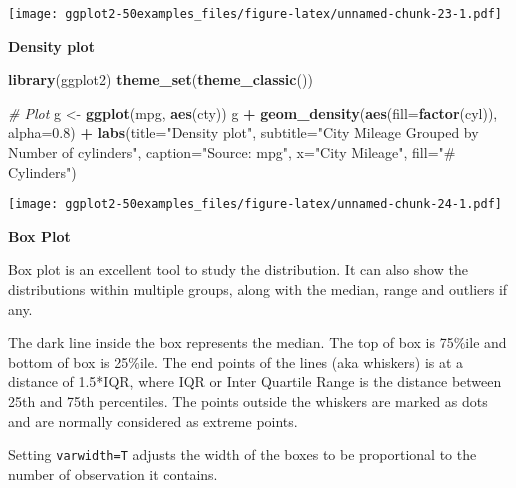 \documentclass[a4paper]{article}
\newenvironment{Shaded}{\begin{snugshade}}{\end{snugshade}}
\newcommand{\KeywordTok}[1]{\textcolor[rgb]{0.13,0.29,0.53}{\textbf{#1}}}
\newcommand{\DataTypeTok}[1]{\textcolor[rgb]{0.13,0.29,0.53}{#1}}
\newcommand{\FloatTok}[1]{\textcolor[rgb]{0.00,0.00,0.81}{#1}}
\newcommand{\StringTok}[1]{\textcolor[rgb]{0.31,0.60,0.02}{#1}}
\newcommand{\CommentTok}[1]{\textcolor[rgb]{0.56,0.35,0.01}{\textit{#1}}}
\newcommand{\OperatorTok}[1]{\textcolor[rgb]{0.81,0.36,0.00}{\textbf{#1}}}
\newcommand{\NormalTok}[1]{#1}
\begin{document}
\texttt{[image: ggplot2-50examples\_files/figure-latex/unnamed-chunk-23-1.pdf]}

\newpage

\textbf{Density plot}

\begin{Shaded}
\begin{Highlighting}[]
\KeywordTok{library}\NormalTok{(ggplot2)}
\KeywordTok{theme_set}\NormalTok{(}\KeywordTok{theme_classic}\NormalTok{())}

\CommentTok{# Plot}
\NormalTok{g <-}\StringTok{ }\KeywordTok{ggplot}\NormalTok{(mpg, }\KeywordTok{aes}\NormalTok{(cty))}
\NormalTok{g }\OperatorTok{+}\StringTok{ }\KeywordTok{geom_density}\NormalTok{(}\KeywordTok{aes}\NormalTok{(}\DataTypeTok{fill=}\KeywordTok{factor}\NormalTok{(cyl)), }\DataTypeTok{alpha=}\FloatTok{0.8}\NormalTok{) }\OperatorTok{+}\StringTok{ }
\StringTok{    }\KeywordTok{labs}\NormalTok{(}\DataTypeTok{title=}\StringTok{"Density plot"}\NormalTok{, }
         \DataTypeTok{subtitle=}\StringTok{"City Mileage Grouped by Number of cylinders"}\NormalTok{,}
         \DataTypeTok{caption=}\StringTok{"Source: mpg"}\NormalTok{,}
         \DataTypeTok{x=}\StringTok{"City Mileage"}\NormalTok{,}
         \DataTypeTok{fill=}\StringTok{"# Cylinders"}\NormalTok{)}
\end{Highlighting}
\end{Shaded}

\texttt{[image: ggplot2-50examples\_files/figure-latex/unnamed-chunk-24-1.pdf]}
\newpage

\textbf{Box Plot}

Box plot is an excellent tool to study the distribution. It can also
show the distributions within multiple groups, along with the median,
range and outliers if any.

The dark line inside the box represents the median. The top of box is
75\%ile and bottom of box is 25\%ile. The end points of the lines (aka
whiskers) is at a distance of 1.5*IQR, where IQR or Inter Quartile Range
is the distance between 25th and 75th percentiles. The points outside
the whiskers are marked as dots and are normally considered as extreme
points.

Setting \texttt{varwidth=T} adjusts the width of the boxes to be
proportional to the number of observation it contains.
\end{document}
